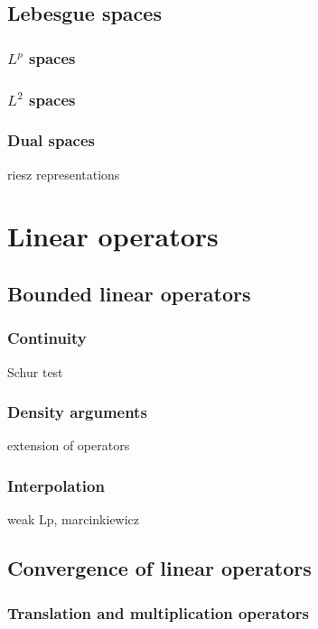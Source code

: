 \documentclass{../note}
\begin{document}
\chapter{Lebesgue spaces}
\section{$L^p$ spaces}
\section{$L^2$ spaces}
\section{Dual spaces}
riesz representations


\part{Linear operators}


\chapter{}




\chapter{Bounded linear operators}
\section{Continuity}
Schur test

\section{Density arguments}
extension of operators

\section{Interpolation}
weak Lp, marcinkiewicz




\chapter{Convergence of linear operators}
\section{Translation and multiplication operators}
\end{document}
